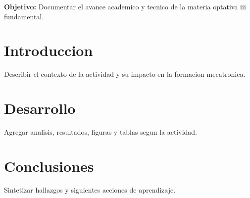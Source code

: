 \documentclass[spanish,letterpaper,oneside]{article}
\begin{document}
\templatePortrait
\templatePagecfg
\onehalfspacing

\begin{abstractd}
\textbf{Objetivo:} Documentar el avance academico y tecnico de la materia optativa iii fundamental.
\end{abstractd}

\templateIndex
\templateFinalcfg

\section{Introduccion}
Describir el contexto de la actividad y su impacto en la formacion mecatronica.

\section{Desarrollo}
Agregar analisis, resultados, figuras y tablas segun la actividad.

\section{Conclusiones}
Sintetizar hallazgos y siguientes acciones de aprendizaje.



\end{document}
